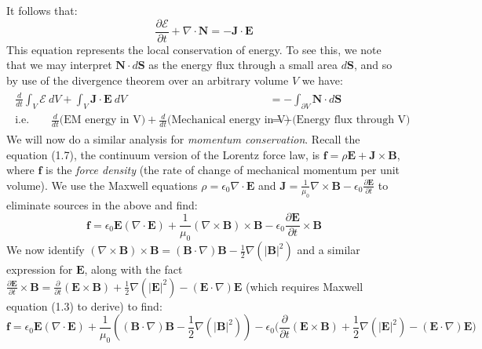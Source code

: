 \documentclass[a4paper]{article}
\numberwithin{equation}{section}
\begin{document}
It follows that:
\begin{equation}
\frac{\partial \mathcal{E}}{\partial t}+\nabla \cdot \mathbf{N}= - \mathbf{J}\cdot \mathbf{E}
\end{equation}
This equation represents the local conservation of energy. To see this, we note that we may interpret $\mathbf{N} \cdot d\mathbf{S}$ as the energy flux through a small area $d\mathbf{S}$, and so by use of the divergence theorem over an arbitrary volume $V$ we have:
\begin{align}
\begin{split}
\frac{d}{dt}\int_V\mathcal{E} \ dV + \int_V \mathbf{J} \cdot \mathbf{E} \ dV &= - \int_{\partial V} \mathbf{N} \cdot d\mathbf{S}\\
\text{i.e.} \qquad \frac{d}{dt} \text{(EM energy in V)} + \frac{d}{dt} \text{(Mechanical energy in V)} &= -\text{(Energy flux through V)}
\end{split}
\end{align}
We will now do a similar analysis for \textit{momentum conservation}. Recall the equation (1.7), the continuum version of the Lorentz force law, is $\mathbf{f}=\rho \mathbf{E}+\mathbf{J}\times \mathbf{B}$, where $\mathbf{f}$ is the \textit{force density} (the rate of change of mechanical momentum per unit volume). We use the Maxwell equations $\rho=\epsilon_0 \nabla \cdot \mathbf{E}$ and $\mathbf{J}=\frac{1}{\mu_0} \nabla \times \mathbf{B} - \epsilon_0 \frac{\partial \mathbf{E}}{\partial t}$ to eliminate sources in the above and find:
\begin{equation}
\mathbf{f}=\epsilon_0 \mathbf{E} (\nabla \cdot \mathbf{E}) + \frac{1}{\mu_0}(\nabla \times \mathbf{B})\times \mathbf{B}-\epsilon_0 \frac{\partial \mathbf{E}}{\partial t}\times \mathbf{B}
\end{equation}
We now identify $(\nabla \times \mathbf{B})\times \mathbf{B}=(\mathbf{B}\cdot \nabla)\mathbf{B}-\frac{1}{2}\nabla(|\mathbf{B}|^2)$ and a similar expression for $\mathbf{E}$, along with the fact $\frac{\partial \mathbf{E}}{\partial t} \times \mathbf{B}= \frac{\partial}{\partial t} (\mathbf{E} \times \mathbf{B})+\frac{1}{2}\nabla(|\mathbf{E}|^2)-(\mathbf{E}\cdot\nabla)\mathbf{E}$ (which requires Maxwell equation (1.3) to derive) to find:
\begin{equation}
\mathbf{f} = \epsilon_0 \mathbf{E}(\nabla \cdot \mathbf{E})+\frac{1}{\mu_0}((\mathbf{B}\cdot \nabla) \mathbf{B}-\frac{1}{2}\nabla(|\mathbf{B}|^2))-\epsilon_0\bigg(\frac{\partial}{\partial t}(\mathbf{E}\times \mathbf{B})+\frac{1}{2}\nabla(|\mathbf{E}|^2)-(\mathbf{E}\cdot \nabla)\mathbf{E} \bigg)
\end{equation}
\end{document}
